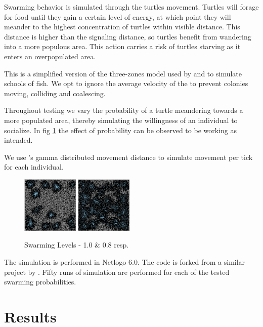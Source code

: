 \documentclass[a4paper,12pt,twocolumn]{report}
\begin{document}
Swarming behavior is simulated through the turtles movement. Turtles will forage for food until they gain a certain level of energy, at which point they will meander to the highest concentration of turtles within visible distance. This distance is higher than the signaling distance, so turtles benefit from wandering into a more populous area. This action carries a risk of turtles starving as it enters an overpopulated area.

This is a simplified version of the three-zones model used by \cite{1982simulation} and \cite{huth1992simulation} to simulate schools of fish. We opt to ignore the average velocity of the to prevent colonies moving, colliding and coalescing.

Throughout testing we vary the probability of a turtle meandering towards a more populated area, thereby simulating the willingness of an individual to socialize. In fig \ref{fig:swarming} the effect of probability can be observed to be working as intended.

We use \cite{edwards2007revisiting}'s gamma distributed movement distance to simulate movement per tick for each individual.

\begin{figure}[t]
 \includegraphics[width=0.24\textwidth]{swarming-high}
 \includegraphics[width=0.24\textwidth]{swarming-low}
 \caption{Swarming Levels - 1.0 \& 0.8 resp.}
 \label{fig:swarming}
\end{figure}

The simulation is performed in Netlogo 6.0. The code is forked from a similar project by \cite{vcavce2007agent}. Fifty runs of simulation are performed for each of the tested swarming probabilities.

\section{Results}
\end{document}
